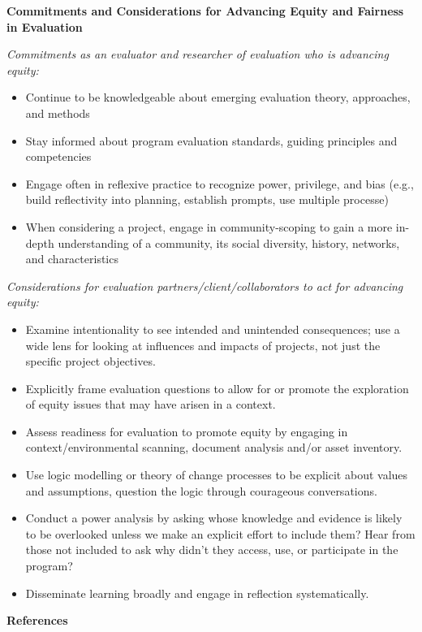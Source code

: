 \documentclass[
]{book}
\begin{document}
\textbf{Commitments and Considerations for Advancing Equity and Fairness in Evaluation}

\emph{Commitments as an evaluator and researcher of evaluation who is advancing equity:}

\begin{itemize}
\item
  Continue to be knowledgeable about emerging evaluation theory, approaches, and methods
\item
  Stay informed about program evaluation standards, guiding principles and competencies
\item
  Engage often in reflexive practice to recognize power, privilege, and bias (e.g., build reflectivity into planning, establish prompts, use multiple processe)
\item
  When considering a project, engage in community-scoping to gain a more in-depth understanding of a community, its social diversity, history, networks, and characteristics
\end{itemize}

\emph{Considerations for evaluation partners/client/collaborators to act for advancing equity:}

\begin{itemize}
\item
  Examine intentionality to see intended and unintended consequences; use a wide lens for looking at influences and impacts of projects, not just the specific project objectives.
\item
  Explicitly frame evaluation questions to allow for or promote the exploration of equity issues that may have arisen in a context.
\item
  Assess readiness for evaluation to promote equity by engaging in context/environmental scanning, document analysis and/or asset inventory.
\item
  Use logic modelling or theory of change processes to be explicit about values and assumptions, question the logic through courageous conversations.
\item
  Conduct a power analysis by asking whose knowledge and evidence is likely to be overlooked unless we make an explicit effort to include them? Hear from those not included to ask why didn't they access, use, or participate in the program?
\item
  Disseminate learning broadly and engage in reflection systematically.
\end{itemize}

\textbf{References}
\end{document}
